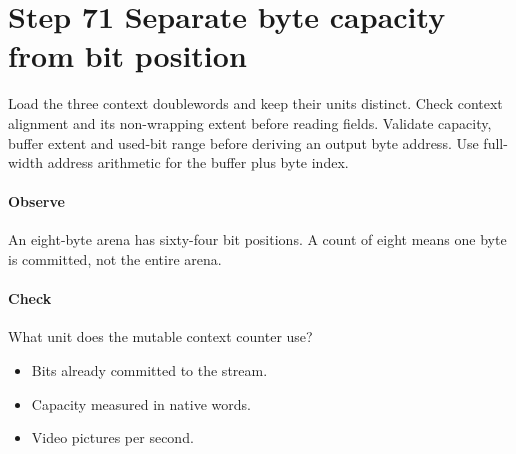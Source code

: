 \section{Step 71 Separate byte capacity from bit position}\label{h263-writer-s01}
Load the three context doublewords and keep their units distinct. Check context
alignment and its non-wrapping extent before reading fields. Validate capacity,
buffer extent and used-bit range before deriving an output byte address. Use
full-width address arithmetic for the buffer plus byte index.

\paragraph{Observe} An eight-byte arena has sixty-four bit positions. A count
of eight means one byte is committed, not the entire arena.
\paragraph{Check} What unit does the mutable context counter use?
\begin{itemize}
  \item[A.] Bits already committed to the stream.
  \item[B.] Capacity measured in native words.
  \item[C.] Video pictures per second.
\end{itemize}
